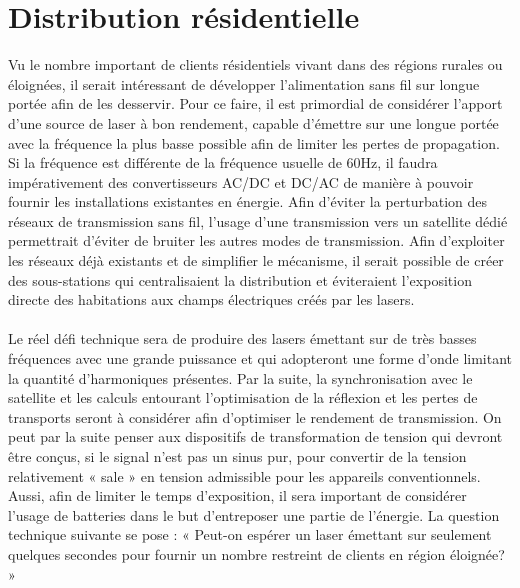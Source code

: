 \section{Distribution résidentielle} Vu le nombre important de clients résidentiels vivant dans des régions rurales ou éloignées, il serait intéressant de développer l’alimentation sans fil sur longue portée afin de les desservir.
Pour ce faire, il est primordial de considérer l’apport d’une source de laser à bon rendement, capable d’émettre sur une longue portée avec la fréquence la plus basse possible afin de limiter les pertes de propagation. Si la fréquence est différente de la fréquence usuelle de 60Hz, il faudra impérativement des convertisseurs AC/DC et DC/AC de manière à pouvoir fournir les installations existantes en énergie. Afin d’éviter la perturbation des réseaux de transmission sans fil, l’usage d’une transmission vers un satellite dédié permettrait d’éviter de bruiter les autres modes de transmission. Afin d’exploiter les réseaux déjà existants et de simplifier le mécanisme, il serait possible de créer des sous-stations qui centralisaient la distribution et éviteraient l’exposition directe des habitations aux champs électriques créés par les lasers.


\paragraph{} Le réel défi technique sera de produire des lasers émettant sur de très basses fréquences avec une grande puissance et qui adopteront une forme d’onde limitant la quantité d’harmoniques présentes. Par la suite, la synchronisation avec le satellite et les calculs entourant l’optimisation de la réflexion et les pertes de transports seront à considérer afin d’optimiser le rendement de transmission. On peut par la suite penser aux dispositifs de transformation de tension qui devront être conçus, si le signal n’est pas un sinus pur, pour convertir de la tension relativement « sale » en tension admissible pour les appareils conventionnels. Aussi, afin de limiter le temps d’exposition, il sera important de considérer l’usage de batteries dans le but d’entreposer une partie de l’énergie. La question technique suivante se pose : « Peut-on espérer un laser émettant sur seulement quelques secondes pour fournir un nombre restreint de clients en région éloignée? » 
